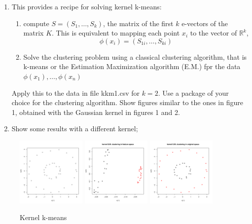 \documentclass{article}[12pt]
\begin{document}
\begin{enumerate}
 \item This provides a recipe for solving kernel k-means: 
 \begin{enumerate}
 \item compute $S=(S_1,\ldots,S_k)$, the matrix of the first $k$ e-vectors of the matrix $K$. This is equivalent to mapping each point $x_i$ to the vector of $\mathbb{R}^k$, 
 \begin{equation}
 \phi(x_i)=(S_{1i},\ldots,S_{ki})
 \end{equation}
 \item Solve the clustering problem using a classical clustering algorithm, that is k-means or the Estimation Maximization algorithm (E.M.) fpr the data $\phi(x_1),\ldots,\phi(x_n)$
 \end{enumerate}
 Apply this to the data in file \mbox{kkm1.csv} for $k=2$. Use a package of your choice for the clustering algorithm. Show figures similar to the ones in figure 1, obtained with the Gaussian kernel in figures 1 and 2.  
 \item Show some results with a different kernel;
\end{enumerate}  
\begin{figure}
	\centering 
\includegraphics[width=0.3\textwidth]{img/data_for_kkm1.pdf}
\includegraphics[width=0.3\textwidth]{img/kkmeans_feat.pdf}
\includegraphics[width=0.3\textwidth]{img/kkmeans_orig.pdf}
\caption{Kernel k-means}
\end{figure}
\end{document}
